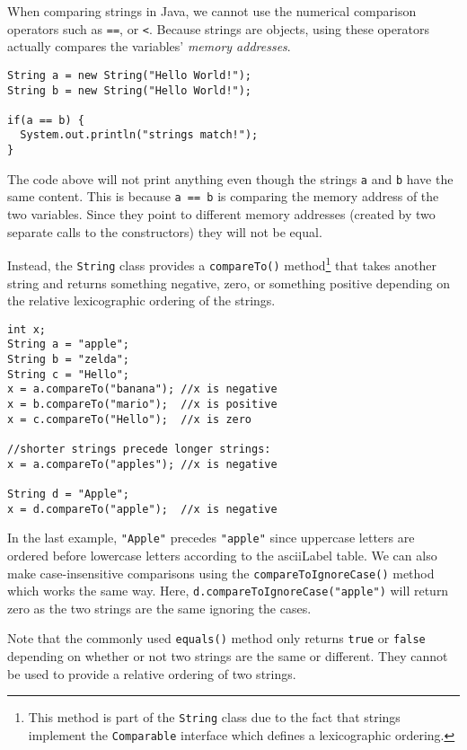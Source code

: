 When comparing strings in Java, we cannot use the 
numerical comparison operators such as \texttt{==}, or
\texttt{<}.  Because strings are objects, 
using these operators actually compares the
variables' \emph{memory addresses}.

\begin{verbatim}
String a = new String("Hello World!");
String b = new String("Hello World!");

if(a == b) {
  System.out.println("strings match!");
}
\end{verbatim}

The code above will not print anything even though
the strings \texttt{a} and \texttt{b}
have the same content.  This is because \texttt{a == b}
is comparing the memory address of the two variables.
Since they point to different memory addresses 
(created by two separate calls to the constructors)
they will not be equal.

Instead, the \texttt{String} class provides a 
\texttt{compareTo()} method\footnote{This method
is part of the \texttt{String} class due to the
fact that strings implement the \texttt{Comparable}
interface which defines a lexicographic ordering.} that takes another
string and returns something negative, zero, or something
positive depending on the relative lexicographic ordering 
of the strings.

\begin{verbatim}
int x;
String a = "apple";
String b = "zelda";
String c = "Hello";
x = a.compareTo("banana"); //x is negative
x = b.compareTo("mario");  //x is positive
x = c.compareTo("Hello");  //x is zero

//shorter strings precede longer strings:
x = a.compareTo("apples"); //x is negative

String d = "Apple";
x = d.compareTo("apple");  //x is negative
\end{verbatim}

In the last example, \texttt{"Apple"} precedes
\texttt{"apple"} since uppercase letters are
ordered before lowercase letters according to the
\gls{asciiLabel} table.  We can also make case-insensitive
comparisons using the \texttt{compareToIgnoreCase()} 
method which works the same way.  Here, 
\texttt{d.compareToIgnoreCase("apple")} will return 
zero as the two strings are the same ignoring the cases.

Note that the commonly used \texttt{equals()} method
only returns \texttt{true} or \texttt{false}
depending on whether or not two strings are the same or 
different.  They cannot be used to provide a relative
ordering of two strings.

